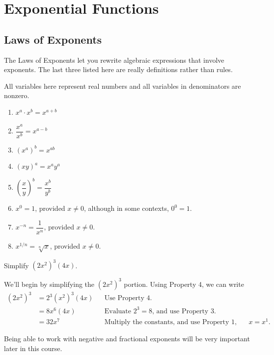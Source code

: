 \section{Exponential Functions}
\label{sec:exp}

\subsection{Laws of Exponents}
\label{ssec:laws-exp}

The Laws of Exponents let you rewrite algebraic expressions that involve exponents. The last three listed here are really definitions rather than rules.

\begin{theorem}
All variables here represent real numbers and all variables in denominators are nonzero.
\begin{enumerate}
    \item $x^a\cdot x^b=x^{a+b}$
		\item $\dfrac{x^a}{x^b}=x^{a-b}$
		\item $\left(x^a\right)^b=x^{ab}$
		\item $(xy)^a=x^a y^a$
		\item $\left(\dfrac{x}{y}\right)^b=\dfrac{x^b}{y^b}$
		\item $x^0=1$, provided $x\neq 0$, although in some contexts, $0^0 = 1$.
		\item $x^{-n}=\dfrac{1}{x^n}$, provided $x\neq 0$.
		\item $x^{1/n}=\sqrt[n]{x}$, provided $x\neq 0$.
\end{enumerate}
\end{theorem}

\begin{example}
Simplify $\left(2x^2\right)^3(4x)$.

\solution We'll begin by simplifying the $\left(2x^2\right)^3$ portion. Using Property 4, we can write
\begin{align*}
\left(2x^2\right)^3 &= 2^3\left(x^2\right)^3(4x)& &\mbox{Use Property 4.}\\
  &= 8x^6(4x)&                  &\mbox{Evaluate $2^3=8$, and use Property 3.}	\\
  &= 32x^7&                     &\mbox{Multiply the constants, and use Property 1, recalling $x=x^1$.}
\end{align*}
\end{example}

Being able to work with negative and fractional exponents will be very important later in this course.

